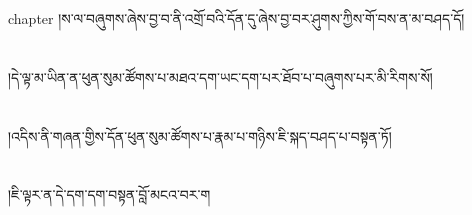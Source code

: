 chapter{ }།ས་ལ་བཞུགས་ཞེས་བྱ་བ་ནི་འགྲོ་བའི་དོན་དུ་ཞེས་བྱ་བར་ཤུགས་ཀྱིས་གོ་བས་ན་མ་བཤད་དོ།\chapter{ }།དེ་ལྟ་མ་ཡིན་ན་ཕུན་སུམ་ཚོགས་པ་མཐའ་དག་ཡང་དག་པར་ཐོབ་པ་བཞུགས་པར་མི་རིགས་སོ།\chapter{ }།འདིས་ནི་གཞན་གྱིས་དོན་ཕུན་སུམ་ཚོགས་པ་རྣམ་པ་གཉིས་ཇི་སྐད་བཤད་པ་བསྟན་ཏོ།\chapter{ }།ཇི་ལྟར་ན་དེ་དག་དག་བསྟན་བློ་མངའ་བར་ག